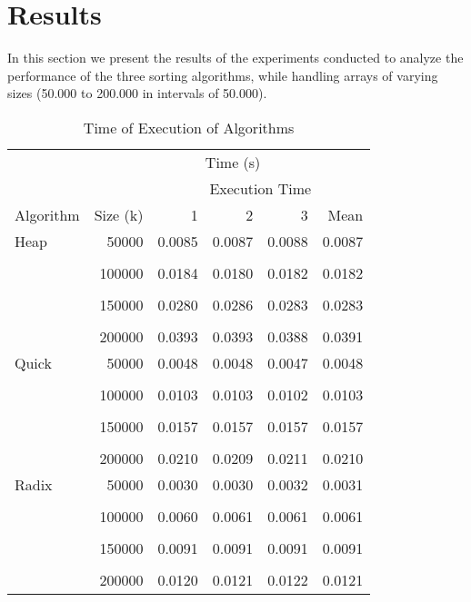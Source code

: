 \documentclass[conference]{IEEEtran}
\providecommand{\tabularnewline}{\\}
\begin{document}
\section{Results}
In this section we present the results of the experiments conducted to analyze the performance of the three sorting algorithms, while handling arrays of varying sizes (50.000 to 200.000 in intervals of 50.000).
\begin{table}[H]
    \caption{Time of Execution of Algorithms\label{tab:tiempos}}
    \centering{}
    \begin{tabular}{lrrrrr}
        \toprule
        &  & \multicolumn{3}{c}{Time (s)}\tabularnewline
        \cmidrule{1-6}
        &  & \multicolumn{4}{c}{Execution Time}\tabularnewline
        \cmidrule{3-5}
        Algorithm & Size (k) & 1 & 2 & 3 & Mean\tabularnewline
        \midrule
        Heap & 50000 & 0.0085 & 0.0087 & 0.0088 & 0.0087\tabularnewline
        \tabularnewline
        & 100000 & 0.0184 & 0.0180 & 0.0182 & 0.0182\tabularnewline
        \tabularnewline
        & 150000 & 0.0280 & 0.0286 & 0.0283 & 0.0283\tabularnewline
        \tabularnewline
        & 200000 & 0.0393 & 0.0393 & 0.0388 & 0.0391\tabularnewline
        \midrule
        Quick & 50000 & 0.0048 & 0.0048 & 0.0047 & 0.0048\tabularnewline
        \tabularnewline
        & 100000 & 0.0103 & 0.0103 & 0.0102 & 0.0103\tabularnewline
        \tabularnewline
        & 150000 & 0.0157 & 0.0157 & 0.0157 & 0.0157\tabularnewline
        \tabularnewline
        & 200000 & 0.0210 & 0.0209 & 0.0211 & 0.0210\tabularnewline
        \midrule
        Radix & 50000 & 0.0030 & 0.0030 & 0.0032 & 0.0031\tabularnewline
        \tabularnewline
        & 100000 & 0.0060 & 0.0061 & 0.0061 & 0.0061\tabularnewline
        \tabularnewline
        & 150000 & 0.0091 & 0.0091 & 0.0091 & 0.0091\tabularnewline
        \tabularnewline
        & 200000 & 0.0120 & 0.0121 & 0.0122 & 0.0121\tabularnewline
        \bottomrule
    \end{tabular}
\end{table}
\end{document}
